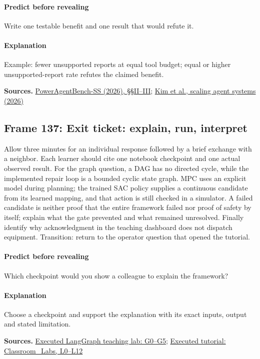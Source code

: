 \documentclass[11pt]{article}
\begin{document}
\paragraph{Predict before revealing}Write one testable benefit and one result that would refute it.
\paragraph{Explanation}Example: fewer unsupported reports at equal tool budget; equal or higher unsupported-report rate refutes the claimed benefit.
\par\nopagebreak\begin{minipage}{\linewidth}{\footnotesize\color{slate}\textbf{Sources.} \href{https://arxiv.org/html/2606.18789v1}{PowerAgentBench-SS (2026), \S{}\S{}II--III}; \href{https://arxiv.org/abs/2512.08296v3}{Kim et al., scaling agent systems (2026)}\par}\end{minipage}\par\medskip
\subsection*{Frame 137: Exit ticket: explain, run, interpret}
Allow three minutes for an individual response followed by a brief exchange with a neighbor. Each learner should cite one notebook checkpoint and one actual observed result. For the graph question, a DAG has no directed cycle, while the implemented repair loop is a bounded cyclic state graph. MPC uses an explicit model during planning; the trained SAC policy supplies a continuous candidate from its learned mapping, and that action is still checked in a simulator. A failed candidate is neither proof that the entire framework failed nor proof of safety by itself; explain what the gate prevented and what remained unresolved. Finally identify why acknowledgment in the teaching dashboard does not dispatch equipment. Transition: return to the operator question that opened the tutorial.\par
\paragraph{Predict before revealing}Which checkpoint would you show a colleague to explain the framework?
\paragraph{Explanation}Choose a checkpoint and support the explanation with its exact inputs, output and stated limitation.
\par\nopagebreak\begin{minipage}{\linewidth}{\footnotesize\color{slate}\textbf{Sources.} \href{../Graph_Workflow_Lab.html}{Executed LangGraph teaching lab: G0--G5}; \href{../Classroom_Labs.html}{Executed tutorial: Classroom\_Labs, L0--L12}\par}\end{minipage}\par\medskip
\end{document}
